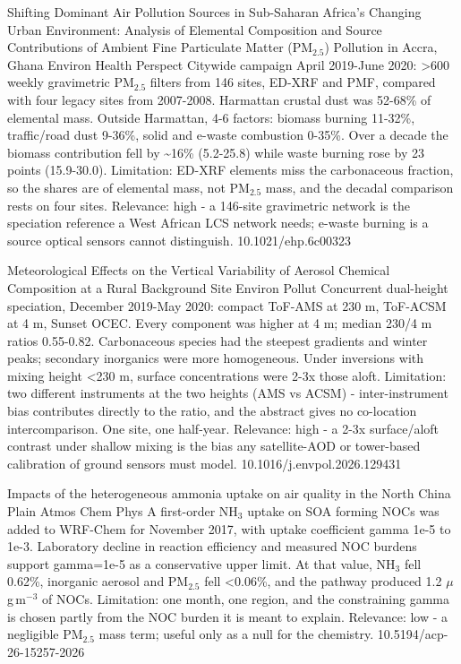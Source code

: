 \documentclass[10pt]{article}
\begin{document}
\par{}\baselineskip{}\baselineskip
{}

{Shifting Dominant Air Pollution Sources in Sub-Saharan Africa's Changing Urban Environment: Analysis of Elemental Composition and Source Contributions of Ambient Fine Particulate Matter (PM$_{2.5}$) Pollution in Accra, Ghana}
{Environ Health Perspect}
{Citywide campaign April 2019-June 2020: >600 weekly gravimetric PM$_{2.5}$ filters from 146 sites, ED-XRF and PMF, compared with four legacy sites from 2007-2008. Harmattan crustal dust was 52-68\% of elemental mass. Outside Harmattan, 4-6 factors: biomass burning 11-32\%, traffic/road dust 9-36\%, solid and e-waste combustion 0-35\%. Over a decade the biomass contribution fell by \textasciitilde{}16\% (5.2-25.8) while waste burning rose by 23 points (15.9-30.0). Limitation: ED-XRF elements miss the carbonaceous fraction, so the shares are of elemental mass, not PM$_{2.5}$ mass, and the decadal comparison rests on four sites. Relevance: high - a 146-site gravimetric network is the speciation reference a West African LCS network needs; e-waste burning is a source optical sensors cannot distinguish.}
{10.1021/ehp.6c00323}

{Meteorological Effects on the Vertical Variability of Aerosol Chemical Composition at a Rural Background Site}
{Environ Pollut}
{Concurrent dual-height speciation, December 2019-May 2020: compact ToF-AMS at 230 m, ToF-ACSM at 4 m, Sunset OCEC. Every component was higher at 4 m; median 230/4 m ratios 0.55-0.82. Carbonaceous species had the steepest gradients and winter peaks; secondary inorganics were more homogeneous. Under inversions with mixing height <230 m, surface concentrations were 2-3x those aloft. Limitation: two different instruments at the two heights (AMS vs ACSM) - inter-instrument bias contributes directly to the ratio, and the abstract gives no co-location intercomparison. One site, one half-year. Relevance: high - a 2-3x surface/aloft contrast under shallow mixing is the bias any satellite-AOD or tower-based calibration of ground sensors must model.}
{10.1016/j.envpol.2026.129431}

{Impacts of the heterogeneous ammonia uptake on air quality in the North China Plain}
{Atmos Chem Phys}
{A first-order NH$_3$ uptake on SOA forming NOCs was added to WRF-Chem for November 2017, with uptake coefficient gamma 1e-5 to 1e-3. Laboratory decline in reaction efficiency and measured NOC burdens support gamma=1e-5 as a conservative upper limit. At that value, NH$_3$ fell 0.62\%, inorganic aerosol and PM$_{2.5}$ fell <0.06\%, and the pathway produced 1.2 $\mu$g\,m$^{-3}$ of NOCs. Limitation: one month, one region, and the constraining gamma is chosen partly from the NOC burden it is meant to explain. Relevance: low - a negligible PM$_{2.5}$ mass term; useful only as a null for the chemistry.}
{10.5194/acp-26-15257-2026}
\end{document}
